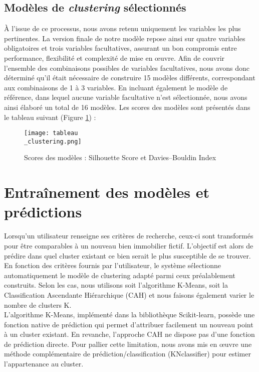 \documentclass[a4paper, 12pt, twoside]{report}
\begin{document}
		\subsection{Modèles de \textit{clustering} sélectionnés}
		
		À l’issue de ce processus, nous avons retenu uniquement les variables les plus pertinentes. La version finale de notre modèle repose ainsi sur quatre variables obligatoires et trois variables facultatives, assurant un bon compromis entre performance, flexibilité et complexité de mise en œuvre. Afin de couvrir l'ensemble des combinaisons possibles de variables facultatives, nous avons donc déterminé qu'il était nécessaire de construire 15 modèles différents, correspondant aux combinaisons de 1 à 3 variables. En incluant également le modèle de référence, dans lequel aucune variable facultative n'est sélectionnée, nous avons ainsi élaboré un total de 16 modèles. Les scores des modèles sont présentés dans le tableau suivant (Figure \ref{tableauClustering}) :

	\begin{figure}[h]
		\centering
		\texttt{[image: tableau\\\_clustering.png]}
		\caption{Scores des modèles : Silhouette Score et Davies–Bouldin Index}
		\label{tableauClustering}
	\end{figure}	
	
	\section{Entraînement des modèles et prédictions}
	
	Lorsqu’un utilisateur renseigne ses critères de recherche, ceux-ci sont transformés pour être comparables à un nouveau bien immobilier fictif. L’objectif est alors de prédire dans quel cluster existant ce bien serait le plus susceptible de se trouver. \\

	En fonction des critères fournis par l’utilisateur, le système sélectionne automatiquement le modèle de clustering adapté parmi ceux préalablement construits. Selon les cas, nous utilisons soit l'algorithme K-Means, soit la Classification Ascendante Hiérarchique (CAH) et nous faisons également varier le nombre de clusters K. \\

	L'algorithme K-Means, implémenté dans la bibliothèque Scikit-learn, possède une fonction native de prédiction qui permet d’attribuer facilement un nouveau point à un cluster existant. En revanche, l’approche CAH ne dispose pas d’une fonction de prédiction directe. Pour pallier cette limitation, nous avons mis en œuvre une méthode complémentaire de prédiction/classification (KNclassifier) pour estimer l’appartenance au cluster.
	
\end{document}
